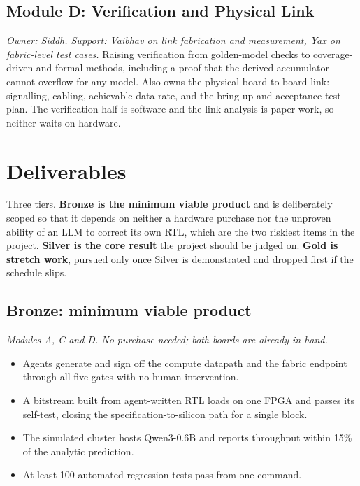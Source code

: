 \documentclass[conference,10pt]{IEEEtran}
\begin{document}
\subsection{Module D: Verification and Physical Link}
\emph{Owner: Siddh. Support: Vaibhav on link fabrication and measurement, Yax on fabric-level test cases.}
Raising verification from golden-model checks to coverage-driven and formal
methods, including a proof that the derived accumulator cannot overflow for any
model. Also owns the physical board-to-board link: signalling, cabling, achievable
data rate, and the bring-up and acceptance test plan. The verification half is
software and the link analysis is paper work, so neither waits on hardware.

\section{Deliverables}
Three tiers. \textbf{Bronze is the minimum viable product} and is deliberately
scoped so that it depends on neither a hardware purchase nor the unproven ability
of an LLM to correct its own RTL, which are the two riskiest items in the project.
\textbf{Silver is the core result} the project should be judged on. \textbf{Gold is
stretch work}, pursued only once Silver is demonstrated and dropped first if the
schedule slips.

\subsection{Bronze: minimum viable product}
\emph{Modules A, C and D. No purchase needed; both boards are already in hand.}
\begin{itemize}\itemsep1pt \parskip0pt
\item Agents generate and sign off the compute datapath and the fabric endpoint
through all five gates with no human intervention.
\item A bitstream built from agent-written RTL loads on one FPGA and passes its
self-test, closing the specification-to-silicon path for a single block.
\item The simulated cluster hosts Qwen3-0.6B and reports throughput within 15\% of
the analytic prediction.
\item At least 100 automated regression tests pass from one command.
\end{itemize}
\end{document}
